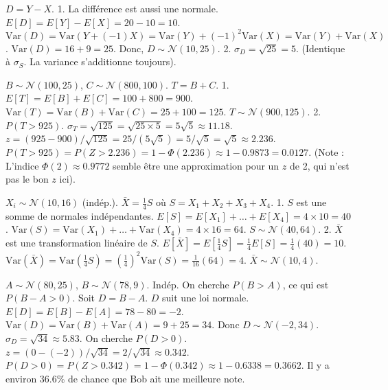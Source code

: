 \begin{correctionbox}
$D = Y - X$.
1.  La différence est aussi une normale.
    $E[D] = E[Y] - E[X] = 20 - 10 = 10$.
    $\text{Var}(D) = \text{Var}(Y + (-1)X) = \text{Var}(Y) + (-1)^2 \text{Var}(X) = \text{Var}(Y) + \text{Var}(X)$.
    $\text{Var}(D) = 16 + 9 = 25$.
    Donc, $D \sim \mathcal{N}(10, 25)$.
2.  $\sigma_D = \sqrt{25} = 5$. (Identique à $\sigma_S$. La variance s'additionne toujours).
\end{correctionbox}

\begin{correctionbox}
$B \sim \mathcal{N}(100, 25)$, $C \sim \mathcal{N}(800, 100)$. $T = B+C$.
1.  $E[T] = E[B] + E[C] = 100 + 800 = 900$.
    $\text{Var}(T) = \text{Var}(B) + \text{Var}(C) = 25 + 100 = 125$.
    $T \sim \mathcal{N}(900, 125)$.
2.  $P(T > 925)$. $\sigma_T = \sqrt{125} = \sqrt{25 \times 5} = 5\sqrt{5} \approx 11.18$.
    $z = (925 - 900) / \sqrt{125} = 25 / (5\sqrt{5}) = 5/\sqrt{5} = \sqrt{5} \approx 2.236$.
    $P(T > 925) = P(Z > 2.236) = 1 - \Phi(2.236) \approx 1 - 0.9873 = 0.0127$.
    (Note : L'indice $\Phi(2) \approx 0.9772$ semble être une approximation pour un $z$ de 2, qui n'est pas le bon $z$ ici).
\end{correctionbox}

\begin{correctionbox}
$X_i \sim \mathcal{N}(10, 16)$ (indép.). $\bar{X} = \frac{1}{4} S$ où $S = X_1+X_2+X_3+X_4$.
1.  $S$ est une somme de normales indépendantes.
    $E[S] = E[X_1] + \dots + E[X_4] = 4 \times 10 = 40$.
    $\text{Var}(S) = \text{Var}(X_1) + \dots + \text{Var}(X_4) = 4 \times 16 = 64$.
    $S \sim \mathcal{N}(40, 64)$.
2.  $\bar{X}$ est une transformation linéaire de $S$.
    $E[\bar{X}] = E[\frac{1}{4}S] = \frac{1}{4}E[S] = \frac{1}{4}(40) = 10$.
    $\text{Var}(\bar{X}) = \text{Var}(\frac{1}{4}S) = (\frac{1}{4})^2 \text{Var}(S) = \frac{1}{16}(64) = 4$.
    $\bar{X} \sim \mathcal{N}(10, 4)$.
\end{correctionbox}

\begin{correctionbox}
$A \sim \mathcal{N}(80, 25)$, $B \sim \mathcal{N}(78, 9)$. Indép.
On cherche $P(B > A)$, ce qui est $P(B - A > 0)$.
Soit $D = B - A$. $D$ suit une loi normale.
$E[D] = E[B] - E[A] = 78 - 80 = -2$.
$\text{Var}(D) = \text{Var}(B) + \text{Var}(A) = 9 + 25 = 34$.
Donc $D \sim \mathcal{N}(-2, 34)$. $\sigma_D = \sqrt{34} \approx 5.83$.
On cherche $P(D > 0)$.
$z = (0 - (-2)) / \sqrt{34} = 2 / \sqrt{34} \approx 0.342$.
$P(D > 0) = P(Z > 0.342) = 1 - \Phi(0.342) \approx 1 - 0.6338 = 0.3662$.
Il y a environ 36.6\% de chance que Bob ait une meilleure note.
\end{correctionbox}

